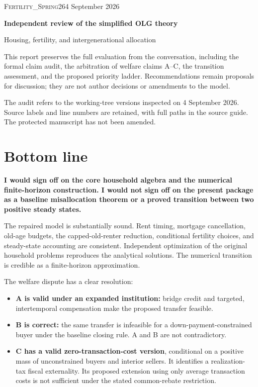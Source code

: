 \documentclass[11pt,letterpaper]{article}
\providecommand{\tightlist}{\setlength{\itemsep}{0.25em}\setlength{\parskip}{0pt}}
\begin{document}
\thispagestyle{empty}
{\small\textsc{Fertility\_Spring26}\hfill 4 September 2026\par}
\vspace{1.0cm}
{\LARGE\bfseries Independent review of the simplified OLG theory\par}
\vspace{0.35cm}
{\large Housing, fertility, and intergenerational allocation\par}
\vspace{0.65cm}
This report preserves the full evaluation from the conversation, including the formal
claim audit, the arbitration of welfare claims A--C, the transition assessment, and
the proposed priority ladder. Recommendations remain proposals for discussion;
they are not author decisions or amendments to the model.

The audit refers to the working-tree versions inspected on 4 September 2026.
Source labels and line numbers are retained, with full paths in the source guide.
The protected manuscript has not been amended.
\vspace{0.35cm}
\tableofcontents
\clearpage
\section{Bottom line}\label{bottom-line}

\textbf{I would sign off on the core household algebra and the numerical finite-horizon
construction. I would not sign off on the present package as a baseline misallocation
theorem or a proved transition between two positive steady states.}

The repaired model is substantially sound. Rent timing, mortgage cancellation, old-age
budgets, the capped-old-renter reduction, conditional fertility choices, and steady-state
accounting are consistent. Independent optimization of the original household problems
reproduces the analytical solutions. The numerical transition is credible as a
finite-horizon approximation.

The welfare dispute has a clear resolution:

\begin{itemize}
\tightlist
\item
  \textbf{A is valid under an expanded institution:} bridge credit and targeted,
  intertemporal compensation make the proposed transfer feasible.
\item
  \textbf{B is correct:} the same transfer is infeasible for a down-payment-constrained
  buyer under the baseline closing rule. A and B are not contradictory.
\item
  \textbf{C has a valid zero-transaction-cost version}, conditional on a positive mass of
  unconstrained buyers and interior sellers. It identifies a realization-tax fiscal
  externality. Its proposed extension using only average transaction costs is not
  sufficient under the stated common-rebate restriction.
\end{itemize}
\end{document}
